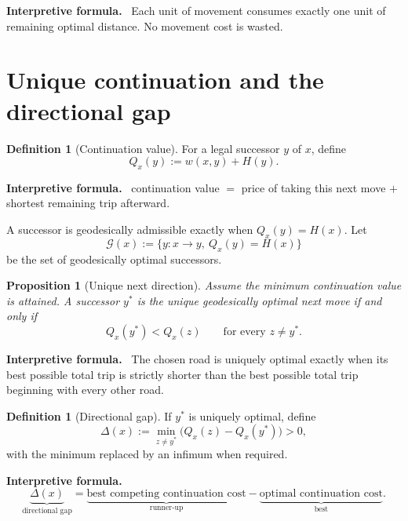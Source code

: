 \documentclass[11pt]{article}
\newtheorem{proposition}[theorem]{Proposition}
\theoremstyle{definition}
\newtheorem{definition}[theorem]{Definition}
\theoremstyle{remark}
\newcommand{\Qval}{Q}
\newcommand{\Gap}{\Delta}
\newenvironment{interpretiveformula}{%
  \begin{center}\begin{minipage}{0.92\textwidth}\small
  \textbf{Interpretive formula.}\ }{\end{minipage}\end{center}}
\begin{document}
\begin{interpretiveformula}
Each unit of movement consumes exactly one unit of remaining optimal distance. No movement cost is wasted.
\end{interpretiveformula}

\section{Unique continuation and the directional gap}

\begin{definition}[Continuation value]
For a legal successor $y$ of $x$, define
\[
\Qval_x(y):=w(x,y)+H(y).
\]
\end{definition}

\begin{interpretiveformula}
continuation value $=$ price of taking this next move $+$ shortest remaining trip afterward.
\end{interpretiveformula}

A successor is geodesically admissible exactly when $\Qval_x(y)=H(x)$. Let
\[
\mathcal G(x):=\{y:x\to y,\ \Qval_x(y)=H(x)\}
\]
be the set of geodesically optimal successors.

\begin{proposition}[Unique next direction]
Assume the minimum continuation value is attained. A successor $y^*$ is the unique geodesically optimal next move if and only if
\[
\Qval_x(y^*)<\Qval_x(z)\qquad\text{for every }z\neq y^*.
\]
\end{proposition}

\begin{interpretiveformula}
The chosen road is uniquely optimal exactly when its best possible total trip is strictly shorter than the best possible total trip beginning with every other road.
\end{interpretiveformula}

\begin{definition}[Directional gap]
If $y^*$ is uniquely optimal, define
\[
\Gap(x):=\min_{z\neq y^*}\bigl(\Qval_x(z)-\Qval_x(y^*)\bigr)>0,
\]
with the minimum replaced by an infimum when required.
\end{definition}

\begin{interpretiveformula}
\[
\underbrace{\Gap(x)}_{\text{directional gap}}
=
\underbrace{\text{best competing continuation cost}}_{\text{runner-up}}
-
\underbrace{\text{optimal continuation cost}}_{\text{best}}.
\]
\end{interpretiveformula}
\end{document}
